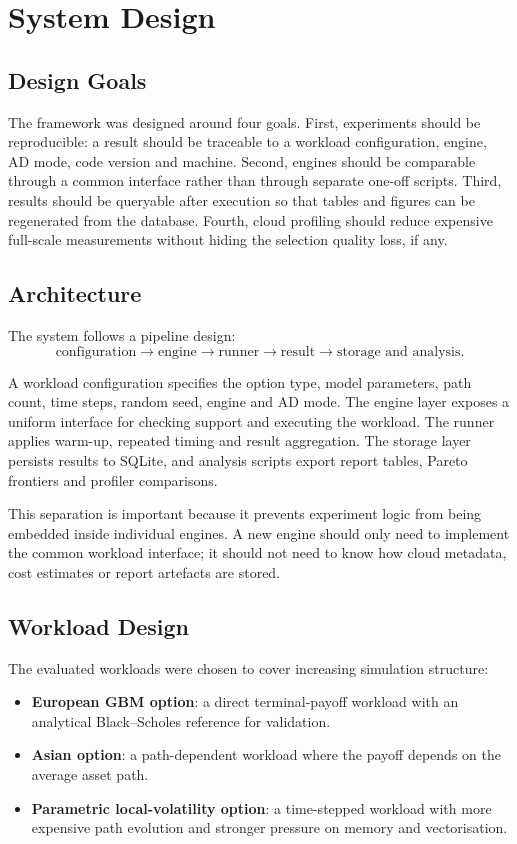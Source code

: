 \chapter{System Design}
\label{chap:design}

\section{Design Goals}

The framework was designed around four goals. First, experiments should be reproducible: a result should be traceable to a workload configuration, engine, AD mode, code version and machine. Second, engines should be comparable through a common interface rather than through separate one-off scripts. Third, results should be queryable after execution so that tables and figures can be regenerated from the database. Fourth, cloud profiling should reduce expensive full-scale measurements without hiding the selection quality loss, if any.

\section{Architecture}

The system follows a pipeline design:
\[
\text{configuration} \rightarrow \text{engine} \rightarrow \text{runner} \rightarrow \text{result} \rightarrow \text{storage and analysis}.
\]

A workload configuration specifies the option type, model parameters, path count, time steps, random seed, engine and AD mode. The engine layer exposes a uniform interface for checking support and executing the workload. The runner applies warm-up, repeated timing and result aggregation. The storage layer persists results to SQLite, and analysis scripts export report tables, Pareto frontiers and profiler comparisons.

This separation is important because it prevents experiment logic from being embedded inside individual engines. A new engine should only need to implement the common workload interface; it should not need to know how cloud metadata, cost estimates or report artefacts are stored.

\section{Workload Design}

The evaluated workloads were chosen to cover increasing simulation structure:
\begin{itemize}
    \item \textbf{European GBM option}: a direct terminal-payoff workload with an analytical Black--Scholes reference for validation.
    \item \textbf{Asian option}: a path-dependent workload where the payoff depends on the average asset path.
    \item \textbf{Parametric local-volatility option}: a time-stepped workload with more expensive path evolution and stronger pressure on memory and vectorisation.
\end{itemize}

